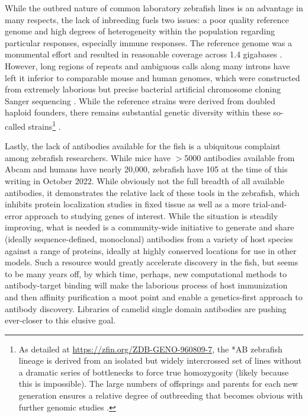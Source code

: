 While the outbred nature of common laboratory zebrafish lines is an advantage in many respects, the lack of inbreeding fuels two issues: a poor quality reference genome and high degrees of heterogeneity within the population regarding particular responses, especially immune responses. The reference genome was a monumental effort and resulted in reasonable coverage across 1.4 gigabases \citep{Howe2013}. However, long regions of repeats and ambiguous calls along many introns have left it inferior to comparable mouse and human genomes, which were constructed from extremely laborious but precise bacterial artificial chromosome cloning Sanger sequencing \citep{Osoegawa2000}. While the reference strains were derived from doubled haploid founders, there remains substantial genetic diversity within these so-called strains\footnote{As detailed at \url{https://zfin.org/ZDB-GENO-960809-7}, the *AB zebrafish lineage is derived from an isolated but widely intercrossed set of lines without a dramatic series of bottlenecks to force true homozygosity (likely because this is impossible). The large numbers of offsprings and parents for each new generation ensures a relative degree of outbreeding that becomes obvious with further genomic studies \citep{Deng2022}.} \citep{Suurvali2020, Holden2018, Deng2022, ZFIN}. 

Lastly, the lack of antibodies available for the fish is a ubiquitous complaint among zebrafish researchers. While mice have $>$5000 antibodies available from Abcam and humans have nearly 20,000, zebrafish have 105 at the time of this writing in October 2022. While obviously not the full breadth of all available antibodies, it demonstrates the relative lack of these tools in the zebrafish, which inhibits protein localization studies in fixed tissue as well as a more trial-and-error approach to studying genes of interest. While the situation is steadily improving, what is needed is a community-wide initiative to generate and share (ideally sequence-defined, monoclonal) antibodies from a variety of host species against a range of proteins, ideally at highly conserved locations for use in other models. Such a resource would greatly accelerate discovery in the fish, but seems to be many years off, by which time, perhaps, new computational methods to antibody-target binding will make the laborious process of host immunization and then affinity purification a moot point and enable a genetics-first approach to antibody discovery. Libraries of camelid single domain antibodies are pushing ever-closer to this elusive goal.

